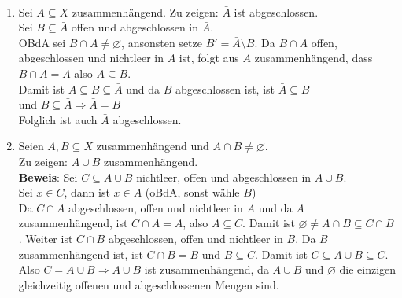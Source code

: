 \begin{solution}
  \
  \begin{enumerate}[label= (\alph*)]
    \item Sei \( A \subseteq X \) zusammenhängend. Zu zeigen: \( \bar{A} \) ist abgeschlossen. \\ 
    Sei \( B \subseteq \bar{A} \) offen und abgeschlossen in \( \bar{A} \). \\
    OBdA sei \( B \cap A \neq \varnothing \), ansonsten setze \( B' = \bar{A} \setminus B \).
    Da \( B \cap A \) offen, abgeschlossen und nichtleer in \( A \) ist, folgt aus \( A \) zusammenhängend, dass 
    \( B \cap A = A \) also \( A \subseteq B \). \\
    Damit ist \( A \subseteq B \subseteq \bar{A} \) und da \( B \) abgeschlossen ist, ist \( \bar{A} \subseteq B \) \\
    und \( B \subseteq \bar{A} \Rightarrow \bar{A} = B \) \\
    Folglich ist auch \( \bar{A} \) abgeschlossen.
    
    \item Seien \( A,B \subseteq X \) zusammenhängend und \( A \cap B \neq \varnothing \). \\
    Zu zeigen: \( A \cup B \) zusammenhängend. \\
    \textbf{Beweis}: Sei \( C \subseteq A \cup B \) nichtleer, offen und abgeschlossen in \( A \cup B \). \\
    Sei \( x \in C \), dann ist \( x \in A \) (oBdA, sonst wähle \( B \))\\
    Da \( C \cap A \) abgeschlossen, offen und nichtleer in \( A \) und da \( A \) zusammenhängend, ist \( C \cap A = A \), also \( A \subseteq C \). Damit ist \( \varnothing \neq A \cap B \subseteq C \cap B \). Weiter ist \( C \cap B \) abgeschlossen, offen und nichtleer in \( B \). Da \( B \) zusammenhängend ist, ist \( C \cap B = B \) und \( B \subseteq C \). Damit ist \( C \subseteq A \cup B \subseteq C \). \\
    Also \( C = A \cup B \Rightarrow A \cup B \) ist zusammenhängend, da \( A \cup B \) und \( \varnothing \) die einzigen gleichzeitig offenen und abgeschlossenen Mengen sind. 
    

\end{enumerate}
\end{solution}

